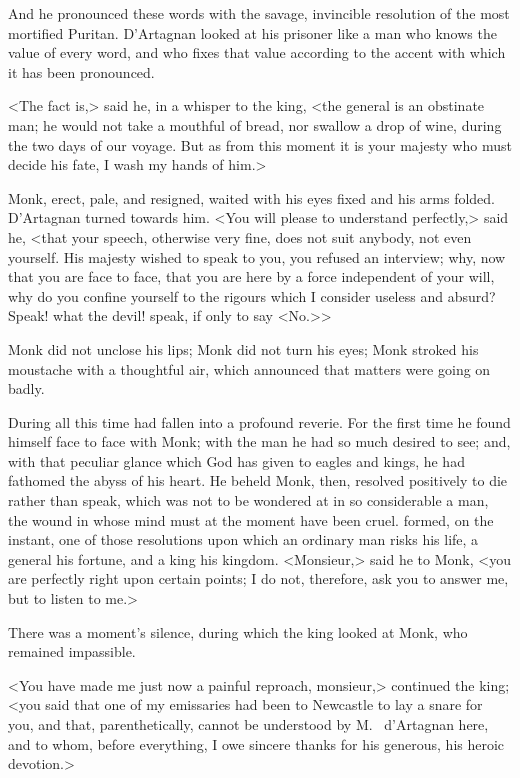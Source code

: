 And he pronounced these words with the savage, invincible resolution of the most mortified Puritan. D'Artagnan looked at his prisoner like a man who knows the value of every word, and who fixes that value according to the accent with which it has been pronounced.

<The fact is,> said he, in a whisper to the king, <the general is an obstinate man; he would not take a mouthful of bread, nor swallow a drop of wine, during the two days of our voyage. But as from this moment it is your majesty who must decide his fate, I wash my hands of him.>

Monk, erect, pale, and resigned, waited with his eyes fixed and his arms folded. D'Artagnan turned towards him. <You will please to understand perfectly,> said he, <that your speech, otherwise very fine, does not suit anybody, not even yourself. His majesty wished to speak to you, you refused an interview; why, now that you are face to face, that you are here by a force independent of your will, why do you confine yourself to the rigours which I consider useless and absurd? Speak! what the devil! speak, if only to say <No.>>

Monk did not unclose his lips; Monk did not turn his eyes; Monk stroked his moustache with a thoughtful air, which announced that matters were going on badly.

During all this time  had fallen into a profound reverie. For the first time he found himself face to face with Monk; with the man he had so much desired to see; and, with that peculiar glance which God has given to eagles and kings, he had fathomed the abyss of his heart. He beheld Monk, then, resolved positively to die rather than speak, which was not to be wondered at in so considerable a man, the wound in whose mind must at the moment have been cruel.  formed, on the instant, one of those resolutions upon which an ordinary man risks his life, a general his fortune, and a king his kingdom. <Monsieur,> said he to Monk, <you are perfectly right upon certain points; I do not, therefore, ask you to answer me, but to listen to me.>

There was a moment's silence, during which the king looked at Monk, who remained impassible.

<You have made me just now a painful reproach, monsieur,> continued the king; <you said that one of my emissaries had been to Newcastle to lay a snare for you, and that, parenthetically, cannot be understood by M.~ d'Artagnan here, and to whom, before everything, I owe sincere thanks for his generous, his heroic devotion.>

